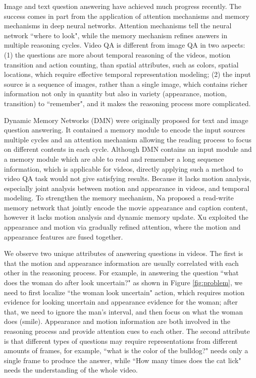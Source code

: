 \documentclass[10pt,twocolumn,letterpaper]{article}
\begin{document}
Image and text question answering have achieved much progress recently. The success comes in part from the application of attention mechanisms \cite{san_Yang_2016_CVPR, hie_coatten_lu2016hierarchical} and memory mechanisms \cite{kumar2016ask} in deep neural networks. Attention mechanisms tell the neural network ``where to look", while the memory mechanism refines answers in multiple reasoning cycles. Video QA is different from image QA \cite{Malinowski_2015_ICCV, hie_coatten_lu2016hierarchical} in two aspects:  (1) the questions are more about temporal reasoning of the videos, \eg motion transition and action counting, than spatial attributes, such as colors, spatial locations, which require effective temporal representation modeling; (2) the input source is a sequence of images, rather than a single image, which contains richer information not only in quantity but also in variety (appearance, motion, transition) to ``remember", and it makes the reasoning process more complicated.



Dynamic Memory Networks (DMN) \cite{kumar2016ask, xiong2016dynamic} were originally proposed for text and image question answering. It contained a memory module to encode the input sources multiple cycles and an attention mechanism allowing the reading process to focus on different contents in each cycle. Although DMN contains an input module and a memory module which are able to read and remember a long sequence information, which is applicable for videos, directly applying such a method to video QA task would not give satisfying results. Because it lacks motion analysis, especially joint analysis between motion and appearance in videos, and temporal modeling. To strengthen the memory mechanism, Na \etal \cite{Na_2017_ICCV} proposed a read-write memory network that jointly encode the movie appearance and caption content, however it lacks motion analysis and dynamic memory update. Xu \etal \cite{xu_2017_video} exploited the appearance and motion via gradually refined attention, where the motion and appearance features are fused together. 

We observe two unique attributes of answering questions in videos. The first is that the motion and appearance information are usually correlated with each other in the reasoning process. For example, in answering the question ``what does the woman do after look uncertain?" as shown in Figure \ref{fig:problem}, we need to first localize ``the woman look uncertain" action, which requires motion evidence for looking uncertain and appearance evidence for the woman; after that, we need to ignore the man's interval, and then focus on what the woman does (smile). Appearance and motion information are both involved in the reasoning process and provide attention cues to each other. The second attribute is that different types of questions may require representations from different amounts of frames, for example, ``what is the color of the bulldog?" needs only a single frame to produce the answer, while ``How many times does the cat lick" needs the understanding of the whole video.
\end{document}
